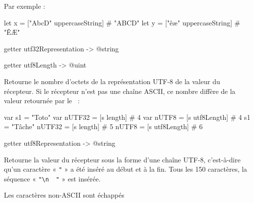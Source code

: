 Par exemple :
\begin{galgas}
let x = ["AbcD" uppercaseString] # "ABCD"
let y = ["êæ" uppercaseString] # "ÊÆ"
\end{galgas}















\begin{galgasbox}
getter utf32Representation -> @string
\end{galgasbox}
















\begin{galgasbox}
getter utf8Length -> @uint
\end{galgasbox}

Retourne le nombre d'octets de la représentation UTF-8 de la valeur du récepteur. Si le récepteur n'est pas une chaîne ASCII, ce nombre diffère de la valeur retournée par le ~:

\begin{galgas}
 var s1 = "Toto"
 var nUTF32 = [s length] # 4
 var nUTF8  = [s utf8Length] # 4
 s1 = "Tâche"
 nUTF32 = [s length] # 5
 nUTF8  = [s utf8Length] # 6
\end{galgas}









\begin{galgasbox}
getter utf8Representation -> @string
\end{galgasbox}

Retourne la valeur du récepteur sous la forme d'une chaîne UTF-8, c'est-à-dire qu'un caractère « \texttt{"} » a été inséré au début et à la fin. Tous les 150 caractères, la séquence « \texttt{"\textbackslash n~~"} » est insérée.

Les caractères non-ASCII sont échappés

